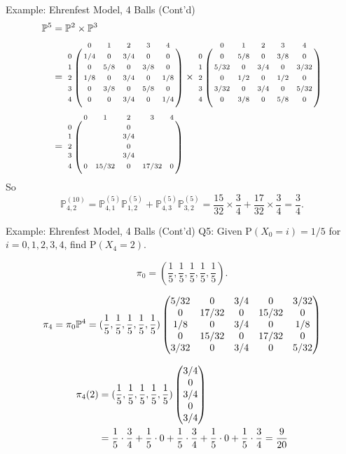 \documentclass[letterpaper, mathserif, handout]{beamer}
\def\P{\mathbb{P}}
\def\p{\mathrm P}
\begin{document}
\begin{frame}{Example: Ehrenfest Model, 4 Balls (Cont'd)}
\begin{align*}
\P^{5}&=\P^2\times \P^3\\
&={\scriptsize
\bordermatrix{%
  &  0  &  1  &  2  &  3  &  4 \cr
0 & 1/4 &  0  & 3/4 &  0  &  0 \cr
1 &  0  & 5/8 &  0  & 3/8 &  0 \cr
2 & 1/8 &  0  & 3/4 &  0  & 1/8\cr
3 &  0  & 3/8 &  0  & 5/8 &  0 \cr
4 &  0  &  0  & 3/4 &  0  & 1/4
}\times
\bordermatrix{%
  &  0  &  1  &  2  &  3  &  4 \cr
0 &  0  & 5/8 &  0  & 3/8 &  0 \cr
1 & 5/32&  0  & 3/4 &  0  &3/32\cr
2 &  0  & 1/2 &  0  & 1/2 &  0 \cr
3 & 3/32&  0  & 3/4 &  0  &5/32\cr
4 &  0  & 3/8 &  0  & 5/8 &  0
}}\\
&={\scriptsize
\bordermatrix{%
  &  0  &  1  &  2  &  3  &  4 \cr
0 &     &     &  0  &     &    \cr
1 &     &     & 3/4 &     &    \cr
2 &     &     &  0  &     &    \cr
3 &     &     & 3/4 &     &    \cr
4 &  0  &15/32&  0  &17/32&  0
}}
\end{align*}
So
\[
\P^{(10)}_{4,2}=\P^{(5)}_{4,1}\P^{(5)}_{1,2}+\P^{(5)}_{4,3}\P^{(5)}_{3,2}
= \frac{15}{32}\times\frac{3}{4}+\frac{17}{32}\times\frac{3}{4}=\frac{3}{4}.
\]
\end{frame}
\begin{frame}{Example: Ehrenfest Model, 4 Balls (Cont'd)}
Q5: Given $\p(X_0=i)=1/5$ for $i=0,1,2,3,4$, find $\p(X_4=2)$.

$$\pi_0=(\frac{1}{5},\frac{1}{5},\frac{1}{5},\frac{1}{5},\frac{1}{5}).$$

$$\pi_4=\pi_0 \P^4=
(\frac{1}{5},\frac{1}{5},\frac{1}{5},\frac{1}{5},\frac{1}{5})
\begin{pmatrix}
5/32&  0  & 3/4 &  0  & 3/32\cr
 0  &17/32&  0  &15/32&  0  \cr
1/8 &  0  & 3/4 &  0  & 1/8 \cr
 0  &15/32&  0  &17/32&  0  \cr
3/32&  0  & 3/4 &  0  & 5/32
\end{pmatrix}
$$

\begin{align*}
\pi_4(2)&= (\frac{1}{5},\frac{1}{5},\frac{1}{5},\frac{1}{5},\frac{1}{5})
\begin{pmatrix}
3/4\cr
 0 \cr
3/4\cr
 0 \cr
3/4
\end{pmatrix}\\
&=
\frac{1}{5}\cdot\frac{3}{4}+
\frac{1}{5}\cdot0+
\frac{1}{5}\cdot\frac{3}{4}+
\frac{1}{5}\cdot0+
\frac{1}{5}\cdot\frac{3}{4}=\frac{9}{20}
\end{align*}
\end{frame}
\end{document}

